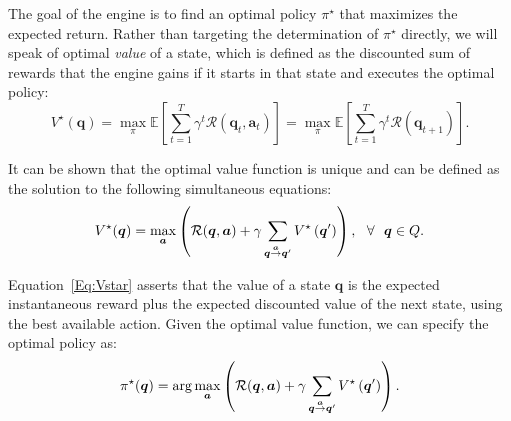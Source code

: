 The goal of the engine is to find an optimal policy $\pi^{\star}$ that maximizes the expected return. Rather than targeting the determination of $\pi^{\star}$ directly, we will speak of optimal \emph{value} of a state, which is defined as the discounted sum of rewards that the engine gains if it starts in that state and executes the optimal policy: 
\begin{equation}
V^{\star}(\bm{q}) = \max_{\pi} \mathbb{E}\left[\sum_{t=1}^{T}\gamma^{t}\mathcal{R}\left(\bm{q}_{t}, \bm{a}_{t}\right)\right] =  \max_{\pi}\mathbb{E}\left[\sum_{t=1}^{T}\gamma^{t}\mathcal{R}\left(\bm{q}_{t+1}\right)\right]. 
\end{equation}

It can be shown that the optimal value function is unique and can be defined as the solution to the following simultaneous equations:
\begin{equation}
\label{Eq:Vstar}
V^{\star}(\bm{q}) = \max_{\bm{a}} \left(\mathcal{R}(\bm{q},\bm{a})+ \gamma \sum_{\bm{q} \goesto[\bm{a}]\bm{q}^{\prime}} V^{\star}\left(\bm{q}^{\prime}\right)\right),  \ \ \forall \ \ \bm{q} \in Q.
\end{equation}

Equation~\ref{Eq:Vstar} asserts that the value of a state $\bm{q}$ is the expected instantaneous reward plus the expected discounted value of the next state, using the best available action. Given the optimal value function, we can specify the optimal policy as:
\begin{equation}
\pi^{\star}(\bm{q}) = \arg\max_{\bm{a}} \left(\mathcal{R}(\bm{q},\bm{a}) + \gamma \sum_{\bm{q} \goesto[\bm{a}]\bm{q}^{\prime}} V^{\star}\left(\bm{q}^{\prime}\right)\right).
\end{equation}